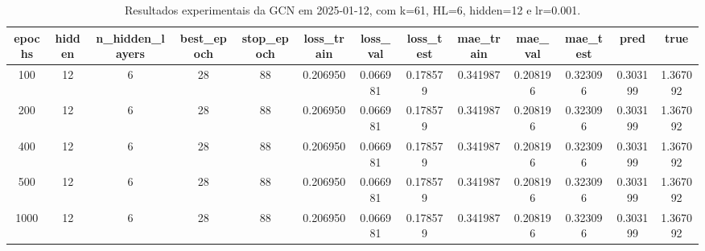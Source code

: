 \begin{table}[h]
\centering
\caption{Resultados experimentais da GCN em 2025-01-12, com k=61, HL=6, hidden=12 e lr=0.001.}
\label{tab:gcn_results_k61_hl6_h12_d20250112}
\begin{tabular}{ccccccccccccc}
\toprule
epochs & hidden & n\_hidden\_layers & best\_epoch & stop\_epoch & loss\_train & loss\_val & loss\_test & mae\_train & mae\_val & mae\_test & pred & true \\
\midrule
100 & 12 & 6 & 28 & 88 & 0.206950 & 0.066981 & 0.178579 & 0.341987 & 0.208196 & 0.323096 & 0.303199 & 1.367092 \\
200 & 12 & 6 & 28 & 88 & 0.206950 & 0.066981 & 0.178579 & 0.341987 & 0.208196 & 0.323096 & 0.303199 & 1.367092 \\
400 & 12 & 6 & 28 & 88 & 0.206950 & 0.066981 & 0.178579 & 0.341987 & 0.208196 & 0.323096 & 0.303199 & 1.367092 \\
500 & 12 & 6 & 28 & 88 & 0.206950 & 0.066981 & 0.178579 & 0.341987 & 0.208196 & 0.323096 & 0.303199 & 1.367092 \\
1000 & 12 & 6 & 28 & 88 & 0.206950 & 0.066981 & 0.178579 & 0.341987 & 0.208196 & 0.323096 & 0.303199 & 1.367092 \\
\bottomrule
\end{tabular}
\end{table}

